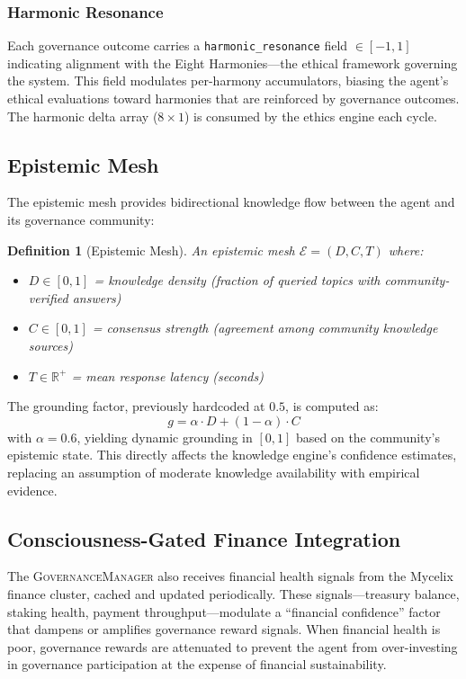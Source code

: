\documentclass[11pt,a4paper]{article}
\newtheorem{definition}{Definition}
\begin{document}
\subsubsection{Harmonic Resonance}

Each governance outcome carries a \texttt{harmonic\_resonance} field $\in [-1, 1]$ indicating alignment with the Eight Harmonies---the ethical framework governing the system.
This field modulates per-harmony accumulators, biasing the agent's ethical evaluations toward harmonies that are reinforced by governance outcomes.
The harmonic delta array ($8 \times 1$) is consumed by the ethics engine each cycle.

\subsection{Epistemic Mesh}

The epistemic mesh provides bidirectional knowledge flow between the agent and its governance community:

\begin{definition}[Epistemic Mesh]
An epistemic mesh $\mathcal{E} = (D, C, T)$ where:
\begin{itemize}
  \item $D \in [0, 1]$ = knowledge density (fraction of queried topics with community-verified answers)
  \item $C \in [0, 1]$ = consensus strength (agreement among community knowledge sources)
  \item $T \in \mathbb{R}^+$ = mean response latency (seconds)
\end{itemize}
\end{definition}

The grounding factor, previously hardcoded at $0.5$, is computed as:
\[
g = \alpha \cdot D + (1 - \alpha) \cdot C
\]
with $\alpha = 0.6$, yielding dynamic grounding in $[0, 1]$ based on the community's epistemic state.
This directly affects the knowledge engine's confidence estimates, replacing an assumption of moderate knowledge availability with empirical evidence.

\subsection{Consciousness-Gated Finance Integration}

The \textsc{GovernanceManager} also receives financial health signals from the Mycelix finance cluster, cached and updated periodically.
These signals---treasury balance, staking health, payment throughput---modulate a ``financial confidence'' factor that dampens or amplifies governance reward signals.
When financial health is poor, governance rewards are attenuated to prevent the agent from over-investing in governance participation at the expense of financial sustainability.
\end{document}
